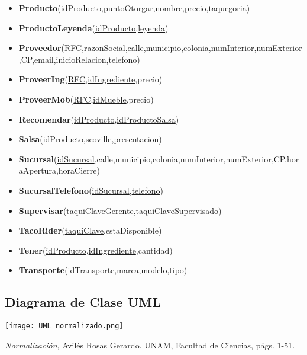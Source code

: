 \documentclass[11pt,letterpaper]{article}
\begin{document}
\begin{itemize}
\item \footnotesize{\textbf{Producto}(\underline{idProducto},puntoOtorgar,nombre,precio,taquegoria)}
\item \footnotesize{\textbf{ProductoLeyenda}(\underline{idProducto,leyenda})}
\item \scriptsize{\textbf{Proveedor}(\underline{RFC},razonSocial,calle,municipio,colonia,numInterior,numExterior,CP,email,inicioRelacion,telefono)}
\item \footnotesize{\textbf{ProveerIng}(\underline{RFC},\underline{idIngrediente},precio)}
\item \footnotesize{\textbf{ProveerMob}(\underline{RFC},\underline{idMueble},precio)}
\item \footnotesize{\textbf{Recomendar}(\underline{idProducto},\underline{idProductoSalsa})}
\item \footnotesize{\textbf{Salsa}(\underline{idProducto},scoville,presentacion)}
\item {\footnotesize \textbf{Sucursal}(\underline{idSucursal},calle,municipio,colonia,numInterior,numExterior,CP,horaApertura,horaCierre)}
\item \footnotesize{\textbf{SucursalTelefono}(\underline{idSucursal},\underline{telefono})}
\item \footnotesize{\textbf{Supervisar}(\underline{taquiClaveGerente},\underline{taquiClaveSupervisado})}
\item \footnotesize{\textbf{TacoRider}(\underline{taquiClave},estaDisponible)}
\item \footnotesize{\textbf{Tener}(\underline{idProducto},\underline{idIngrediente},cantidad)}
\item \footnotesize{\textbf{Transporte}(\underline{idTransporte},marca,modelo,tipo)}

\end{itemize}
\subsection{Diagrama de Clase UML}

 \begin{landscape}
\begin{center}
\begin{minipage}{1\linewidth}
\texttt{[image: UML\_normalizado.png]}
\end{minipage}
\end{center}
\end{landscape}





\newpage 
 \begin{thebibliography}{1}


     \textit{Normalización}, Avilés Rosas Gerardo. UNAM, Facultad de Ciencias, págs. 1-51.


  \end{thebibliography}
\end{document}
